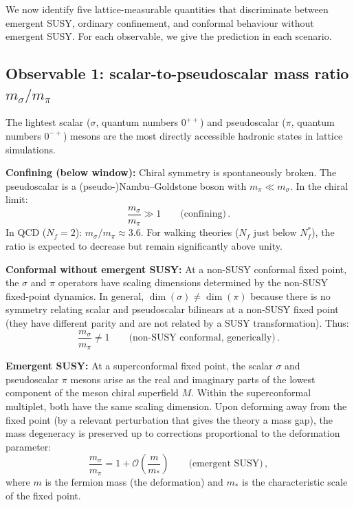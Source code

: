 \documentclass[11pt,a4paper]{article}
\theoremstyle{plain}
\theoremstyle{definition}
\theoremstyle{remark}
\newcommand{\Nf}{N_{\!f}}
\newcommand{\Nfstar}{\Nf^*}
\begin{document}
We now identify five lattice-measurable quantities that discriminate
between emergent SUSY, ordinary confinement, and conformal behaviour
without emergent SUSY.  For each observable, we give the
prediction in each scenario.

\subsection{Observable 1: scalar-to-pseudoscalar mass ratio
  $m_\sigma / m_\pi$}
\label{ssec:obs1}

The lightest scalar ($\sigma$, quantum numbers $0^{++}$) and
pseudoscalar ($\pi$, quantum numbers $0^{-+}$) mesons are the most
directly accessible hadronic states in lattice simulations.

\textbf{Confining (below window):}  Chiral symmetry is spontaneously
broken.  The pseudoscalar is a (pseudo-)Nambu--Goldstone boson with
$m_\pi \ll m_\sigma$.  In the chiral limit:
\begin{equation}\label{eq:conf-ratio}
  \frac{m_\sigma}{m_\pi} \gg 1
  \qquad\text{(confining)}\,.
\end{equation}
In QCD ($\Nf = 2$): $m_\sigma / m_\pi \approx 3.6$.  For walking
theories ($\Nf$ just below $\Nfstar$), the ratio is expected to
decrease but remain significantly above unity.

\textbf{Conformal without emergent SUSY:}  At a non-SUSY conformal
fixed point, the $\sigma$ and $\pi$ operators have scaling dimensions
determined by the non-SUSY fixed-point dynamics.  In general,
$\dim(\sigma) \neq \dim(\pi)$ because there is no symmetry relating
scalar and pseudoscalar bilinears at a non-SUSY fixed point (they have
different parity and are not related by a SUSY transformation).  Thus:
\begin{equation}\label{eq:BZ-ratio}
  \frac{m_\sigma}{m_\pi} \neq 1
  \qquad\text{(non-SUSY conformal, generically)}\,.
\end{equation}

\textbf{Emergent SUSY:}  At a superconformal fixed point, the scalar
$\sigma$ and pseudoscalar $\pi$ mesons arise as the real and imaginary
parts of the lowest component of the meson chiral superfield $M$.
Within the superconformal multiplet, both have the same scaling
dimension.  Upon deforming away from the fixed point (by a relevant
perturbation that gives the theory a mass gap), the mass degeneracy
is preserved up to corrections proportional to the deformation
parameter:
\begin{equation}\label{eq:SUSY-ratio}
  \boxed{
    \frac{m_\sigma}{m_\pi}
    = 1 + \mathcal{O}\!\left(\frac{m}{m_*}\right)
    \qquad\text{(emergent SUSY)}\,,
  }
\end{equation}
where $m$ is the fermion mass (the deformation) and $m_*$ is the
characteristic scale of the fixed point.
\end{document}
